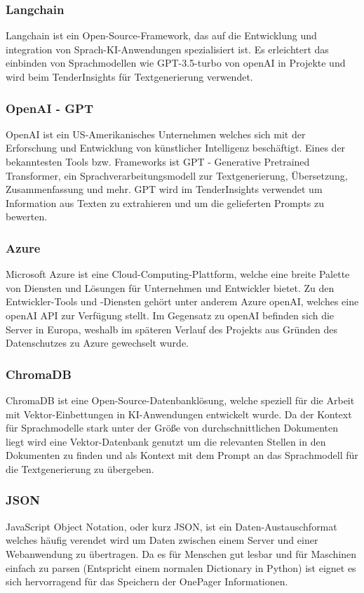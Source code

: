 \subsubsection{Langchain}
Langchain ist ein Open-Source-Framework, das auf die Entwicklung und integration von Sprach-KI-Anwendungen spezialisiert
ist. Es erleichtert das einbinden von Sprachmodellen wie GPT-3.5-turbo von openAI in Projekte und wird beim
TenderInsights für Textgenerierung verwendet.

\subsubsection{OpenAI - GPT}
OpenAI ist ein US-Amerikanisches Unternehmen welches sich mit der Erforschung und Entwicklung von künstlicher
Intelligenz beschäftigt. Eines der bekanntesten Tools bzw. Frameworks ist GPT - Generative Pretrained Transformer, ein
Sprachverarbeitungsmodell zur Textgenerierung, Übersetzung, Zusammenfassung und mehr. GPT wird im TenderInsights
verwendet um Information aus Texten zu extrahieren und um die gelieferten Prompts zu bewerten.

\subsubsection{Azure}
Microsoft Azure ist eine Cloud-Computing-Plattform, welche eine breite Palette von Diensten und Lösungen für Unternehmen
und Entwickler bietet. Zu den Entwickler-Tools und -Diensten gehört unter anderem Azure openAI, welches eine openAI API
zur Verfügung stellt. Im Gegensatz zu openAI befinden sich die Server in Europa, weshalb im späteren Verlauf des
Projekts aus Gründen des Datenschutzes zu Azure gewechselt wurde.

\subsubsection{ChromaDB}
ChromaDB ist eine Open-Source-Datenbanklösung, welche speziell für die Arbeit mit Vektor-Einbettungen in KI-Anwendungen
entwickelt wurde. Da der Kontext für Sprachmodelle stark unter der Größe von durchschnittlichen Dokumenten liegt wird
eine Vektor-Datenbank genutzt um die relevanten Stellen in den Dokumenten zu finden und als Kontext mit dem Prompt an
das Sprachmodell für die Textgenerierung zu übergeben.

\subsubsection{JSON}
JavaScript Object Notation, oder kurz JSON, ist ein Daten-Austauschformat welches häufig verendet wird um Daten zwischen
einem Server und einer Webanwendung zu übertragen. Da es für Menschen gut lesbar und für Maschinen einfach zu parsen
(Entspricht einem normalen Dictionary in Python) ist eignet es sich hervorragend für das Speichern der OnePager
Informationen.

